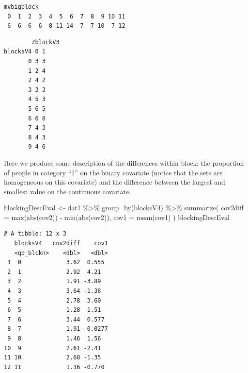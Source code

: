 \documentclass[
  12pt,
]{book}
\newenvironment{Shaded}{\begin{snugshade}}{\end{snugshade}}
\newcommand{\AttributeTok}[1]{\textcolor[rgb]{0.77,0.63,0.00}{#1}}
\newcommand{\DecValTok}[1]{\textcolor[rgb]{0.00,0.00,0.81}{#1}}
\newcommand{\FunctionTok}[1]{\textcolor[rgb]{0.00,0.00,0.00}{#1}}
\newcommand{\NormalTok}[1]{#1}
\newcommand{\OtherTok}[1]{\textcolor[rgb]{0.56,0.35,0.01}{#1}}
\newcommand{\SpecialCharTok}[1]{\textcolor[rgb]{0.00,0.00,0.00}{#1}}
\theoremstyle{definition}
\theoremstyle{definition}
\theoremstyle{definition}
\theoremstyle{remark}
\begin{document}
\begin{verbatim}
mvbigblock
 0  1  2  3  4  5  6  7  8  9 10 11 
 6  6  6  6  8 11 14  7  7 10  7 12 
\end{verbatim}

\begin{Shaded}
\end{Shaded}

\begin{verbatim}
        ZblockV3
blocksV4 0 1
       0 3 3
       1 2 4
       2 4 2
       3 3 3
       4 5 3
       5 6 5
       6 6 8
       7 4 3
       8 4 3
       9 4 6
\end{verbatim}

Here we produce some description of the differences within block: the
proportion of people in category ``1'' on the binary covariate (notice
that the sets are homogeneous on this covariate) and the difference
between the largest and smallest value on the continuous covariate.

\begin{Shaded}
\begin{Highlighting}[]
\NormalTok{blockingDescEval }\OtherTok{\textless{}{-}}\NormalTok{ dat1 }\SpecialCharTok{\%\textgreater{}\%}
  \FunctionTok{group\_by}\NormalTok{(blocksV4) }\SpecialCharTok{\%\textgreater{}\%}
  \FunctionTok{summarize}\NormalTok{(}
    \AttributeTok{cov2diff =} \FunctionTok{max}\NormalTok{(}\FunctionTok{abs}\NormalTok{(cov2))}
    \SpecialCharTok{{-}} \FunctionTok{min}\NormalTok{(}\FunctionTok{abs}\NormalTok{(cov2)),}
    \AttributeTok{cov1 =} \FunctionTok{mean}\NormalTok{(cov1)}
\NormalTok{  )}
\NormalTok{blockingDescEval}
\end{Highlighting}
\end{Shaded}

\begin{verbatim}
# A tibble: 12 x 3
   blocksV4   cov2diff    cov1
   <qb_blckn>    <dbl>   <dbl>
 1  0             3.62  0.555 
 2  1             2.92  4.21  
 3  2             1.91 -3.89  
 4  3             3.64 -1.38  
 5  4             2.78  3.60  
 6  5             1.28  1.51  
 7  6             3.44  0.577 
 8  7             1.91 -0.0277
 9  8             1.46  1.56  
10  9             2.61 -2.41  
11 10             2.68 -1.35  
12 11             1.16 -0.770 
\end{verbatim}
\end{document}
